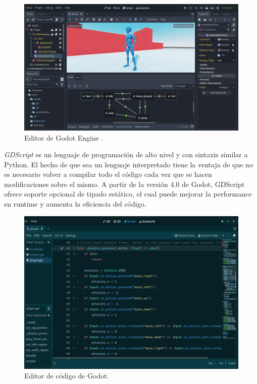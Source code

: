 \begin{figure}[htbp]
    \centering
    \includegraphics[width=1.0\textwidth]{../assets/godot-engine-showcase.png}
    \caption{Editor de Godot Engine \cite{ref1}.}
\end{figure}

\textit{GDScript} es un lenguaje de programación de alto nivel y con sintaxis similar a Python. 
El hecho de que sea un lenguaje interpretado tiene la ventaja de que no es necesario volver a compilar 
todo el código cada vez que se hacen modificaciones sobre el mismo.
A partir de la versión 4.0 de Godot, GDScript ofrece soporte opcional de tipado estático, el cual puede
mejorar la performance en runtime y aumenta la eficiencia del código.

\begin{figure}[htbp]
    \centering
    \includegraphics[width=1.0\textwidth]{../assets/godot-code-editor.png}
    \caption{Editor de código de Godot.}
\end{figure}

